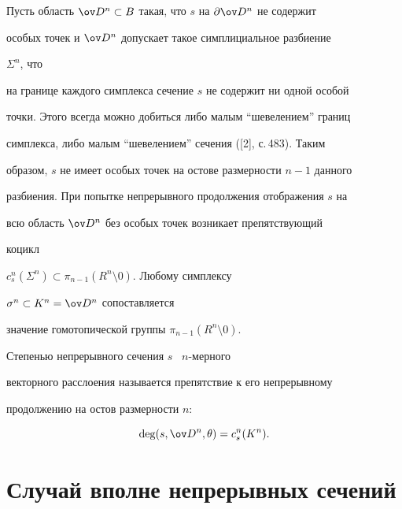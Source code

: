  


 


Пусть область $\ov D{}^n\subset B$ такая, что $s$ на $\partial\ov 


D{}^n$ не содержит 


особых точек и $\ov D{}^n$ допускает такое симплициальное разбиение 


$\Sigma^n$, что 


на границе каждого симплекса сечение $s$ не содержит ни одной особой 


точки. Этого всегда можно добиться либо малым ``шевелением'' границ 


симплекса, либо малым ``шевелением'' сечения ([2], с.\,483). Таким 


образом, $s$ не имеет особых точек на остове размерности $n-1$ данного 


разбиения. При попытке непрерывного продолжения отображения $s$ на 


всю область $\ov D{}^n$ без особых точек возникает препятствующий 


коцикл 


$c^n_s(\Sigma^n)\subset\pi_{n-1}(R^n\setminus0)$. Любому симплексу 


$\sigma^n\subset K^n=\ov D{}^n$ сопоставляется 


значение гомотопической группы $\pi_{n-1}(R^n\setminus0)$. 


 


\begin{defn} 


Степенью непрерывного сечения $s$ \ $n$-мерного 


векторного расслоения называется препятствие к его непрерывному 


продолжению на остов размерности $n$\/${:}$ 


$$ 


\deg(s,\ov D{}^n,\theta)=c^n_s(K^n). 


$$ 


\end{defn} 


 


 


\section{Случай вполне непрерывных сечений} 


 


